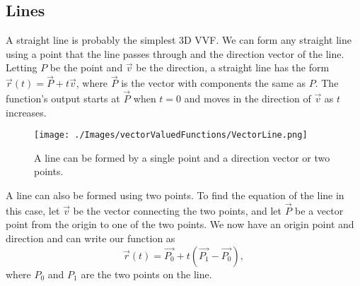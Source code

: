 \subsection{Lines}
\noindent
A straight line is probably the simplest 3D VVF. We can form any straight line using a point that the line passes through and the direction vector of the line.
Letting $P$ be the point and $\vec{v}$ be the direction, a straight line has the form $\vec{r}(t) = \vec{P}+t\vec{v}$, where $\vec{P}$ is the vector with components the same as $P$.
The function's output starts at $\vec{P}$ when $t=0$ and moves in the direction of $\vec{v}$ as $t$ increases.

\begin{figure}[H]
	\centering
	\texttt{[image: ./Images/vectorValuedFunctions/VectorLine.png]}
	\caption{A line can be formed by a single point and a direction vector or two points.}
\end{figure}

\noindent
A line can also be formed using two points.
To find the equation of the line in this case, let $\vec{v}$ be the vector connecting the two points, and let $\vec{P}$ be a vector point from the origin to one of the two points.
We now have an origin point and direction and can write our function as
\begin{equation*}
	\vec{r}(t) = \vec{P_0} + t\left(\vec{P_1} - \vec{P_0}\right),	
\end{equation*}
where $P_0$ and $P_1$ are the two points on the line.